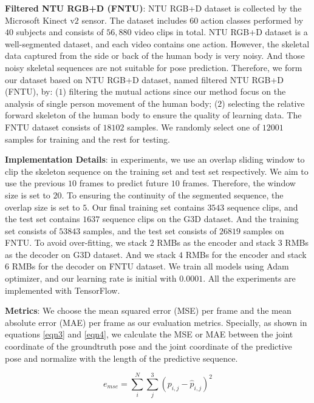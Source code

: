 \documentclass[journal]{IEEEtran}
\begin{document}
{\bf Filtered NTU RGB+D (FNTU)}: NTU RGB+D \cite{AmirNTU} dataset is collected by the Microsoft Kinect v${2}$ sensor. The dataset includes 60 action classes performed by ${40}$ subjects and consists of ${56,880}$ video clips in total. NTU RGB+D dataset is a well-segmented dataset, and each video contains one action. However, the skeletal data captured from the side or back of the human body is very noisy. And those noisy skeletal sequences are not suitable for pose prediction. Therefore, we form our dataset based on NTU RGB+D dataset, named filtered NTU RGB+D (FNTU), by: (${1}$) filtering the mutual actions since our method focus on the analysis of single person movement of the human body; (${2}$) selecting the relative forward skeleton of the human body to ensure the quality of learning data. The FNTU dataset consists of ${18102}$ samples. We randomly select one of ${12001}$ samples for training and the rest for testing.

{\bf Implementation Details}: in experiments, we use an overlap sliding window to clip the skeleton sequence on the training set and test set respectively. We aim to use the previous ${10}$ frames to predict future ${10}$ frames. Therefore, the window size is set to ${20}$. To ensuring the continuity of the segmented sequence, the overlap size is set to ${5}$. Our final training set contains ${3543}$ sequence clips, and the test set contains ${1637}$ sequence clips on the G${3}$D dataset. And the training set consists of ${53843}$ samples, and the test set consists of ${26819}$ samples on FNTU. To avoid over-fitting, we stack ${2}$ RMBs as the encoder and stack ${3}$ RMBs as the decoder on G${3}$D dataset. And we stack ${4}$ RMBs for the encoder and stack ${6}$ RMBs for the decoder on FNTU dataset. We train all models using Adam optimizer, and our learning rate is initial with ${0.0001}$. All the experiments are implemented with TensorFlow.

{\bf Metrics}: We choose the mean squared error (MSE) per frame and the mean absolute error (MAE) per frame as our evaluation metrics. Specially, as shown in equations \ref{eqn3} and \ref{eqn4}, we calculate the MSE or MAE between the joint coordinate of the groundtruth pose and the joint coordinate of the predictive pose and normalize with the length of the predictive sequence.

\begin{equation}
\label{eqn3}
{e_{mse}} = \sum\limits_i^N {\sum\limits_j^3 {{{({p_{i,j}} - {{\widehat p}_{i,j}})}^2}} }
\end{equation}
\end{document}
